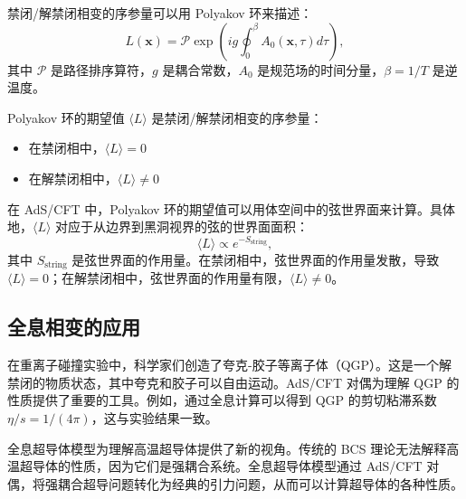\begin{definition}[Polyakov 环]
禁闭/解禁闭相变的序参量可以用 Polyakov 环来描述：
\begin{equation}
    L(\mathbf{x}) = \mathcal{P} \exp\left(i g \oint_0^\beta A_0(\mathbf{x}, \tau) d\tau\right),
\end{equation}
其中 $\mathcal{P}$ 是路径排序算符，$g$ 是耦合常数，$A_0$ 是规范场的时间分量，$\beta = 1/T$ 是逆温度。
\end{definition}

\begin{property}
Polyakov 环的期望值 $\langle L \rangle$ 是禁闭/解禁闭相变的序参量：
\begin{itemize}
    \item 在禁闭相中，$\langle L \rangle = 0$
    \item 在解禁闭相中，$\langle L \rangle \neq 0$
\end{itemize}
\end{property}

\begin{remark}
在 AdS/CFT 中，Polyakov 环的期望值可以用体空间中的弦世界面来计算。具体地，$\langle L \rangle$ 对应于从边界到黑洞视界的弦的世界面面积：
\begin{equation}
    \langle L \rangle \propto e^{-S_{\text{string}}},
\end{equation}
其中 $S_{\text{string}}$ 是弦世界面的作用量。在禁闭相中，弦世界面的作用量发散，导致 $\langle L \rangle = 0$；在解禁闭相中，弦世界面的作用量有限，$\langle L \rangle \neq 0$。
\end{remark}

\subsection{全息相变的应用}

\begin{example}[夸克-胶子等离子体]
在重离子碰撞实验中，科学家们创造了夸克-胶子等离子体（QGP）。这是一个解禁闭的物质状态，其中夸克和胶子可以自由运动。AdS/CFT 对偶为理解 QGP 的性质提供了重要的工具。例如，通过全息计算可以得到 QGP 的剪切粘滞系数 $\eta/s = 1/(4\pi)$，这与实验结果一致。
\end{example}

\begin{example}[凝聚态物理中的相变]
全息超导体模型为理解高温超导体提供了新的视角。传统的 BCS 理论无法解释高温超导体的性质，因为它们是强耦合系统。全息超导体模型通过 AdS/CFT 对偶，将强耦合超导问题转化为经典的引力问题，从而可以计算超导体的各种性质。
\end{example}

